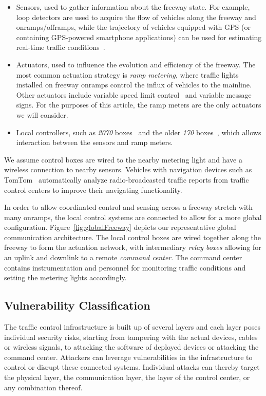     		\begin{itemize}
    			\item Sensors, used to gather information about the freeway state. For example, loop detectors are used to acquire the flow of vehicles along the freeway and onramps/offramps, while the trajectory of vehicles equipped with GPS (or containing GPS-powered smartphone applications) can be used for estimating real-time traffic conditions~\cite{work2010traffic}.
    			\item Actuators, used to influence the evolution and efficiency of the freeway. The most common actuation strategy is \emph{ramp metering}, where traffic lights installed on freeway onramps control the influx of vehicles to the mainline. Other actuators include variable speed limit control~\cite{MuralidharanaCustom} and variable message signs. For the purposes of this article, the ramp meters are the only actuators we will consider.
    			\item Local controllers, such as \emph{2070} boxes~\cite{AASHTO2012} and the older \emph{170} boxes~\cite{FHWA1978}, which allows interaction between the sensors and ramp meters.
    		\end{itemize}
    		We assume control boxes are wired to the nearby metering light and have a wireless connection to nearby sensors. Vehicles with navigation devices such as TomTom~\cite{tomtom} automatically analyze radio-broadcasted traffic reports from traffic control centers to improve their navigating functionality.
    
    		In order to allow coordinated control and sensing across a freeway stretch with many onramps, the local control systems are connected to allow for a more global configuration. Figure~\ref{fig:globalFreeway} depicts our representative global communication architecture. The local control boxes are wired together along the freeway to form the actuation network, with intermediary \emph{relay boxes} allowing for an uplink and downlink to a remote \emph{command center}. The command center contains instrumentation and personnel for monitoring traffic conditions and setting the metering lights accordingly.

\subsection{Vulnerability Classification}
\label{sec:traffic-system-vulnerabilities}

    The traffic control infrastructure is built up of several layers and each layer poses individual security risks, starting from tampering with the actual devices, cables or wireless signals, to attacking the software of deployed devices or attacking the command center.
    Attackers can leverage vulnerabilities in the infrastructure to control or disrupt these
    connected systems. Individual attacks can thereby target the physical layer, the
    communication layer, the layer of the control center, or any combination
    thereof.
    
